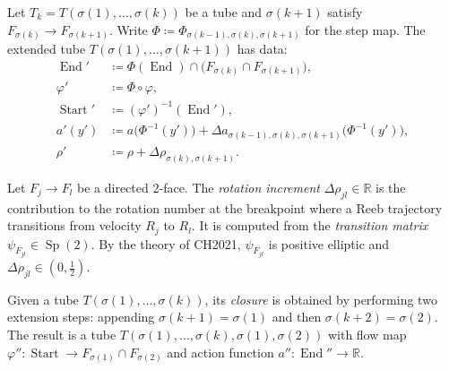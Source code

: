 \begin{unverified}
\begin{definition}\label{def:tube-extension}
Let $T_k = T(\sigma(1), \ldots, \sigma(k))$ be a tube
and $\sigma(k+1)$ satisfy $F_{\sigma(k)} \to F_{\sigma(k+1)}$.
Write $\Phi \coloneqq \Phi_{\sigma(k-1),\sigma(k),\sigma(k+1)}$
for the step map.
The extended tube $T(\sigma(1), \ldots, \sigma(k+1))$ has data:
\begin{align*}
  \operatorname{End}' &\coloneqq
    \Phi(\operatorname{End}) \cap \bigl( F_{\sigma(k)} \cap F_{\sigma(k+1)} \bigr), \\
  \varphi' &\coloneqq \Phi \circ \varphi, \\
  \operatorname{Start}' &\coloneqq (\varphi')^{-1}(\operatorname{End}'), \\
  a'(y') &\coloneqq
    a\bigl(\Phi^{-1}(y')\bigr)
    + \Delta a_{\sigma(k-1),\sigma(k),\sigma(k+1)}\bigl(\Phi^{-1}(y')\bigr), \\
  \rho' &\coloneqq \rho + \Delta\rho_{\sigma(k),\sigma(k+1)}.
\end{align*}
\end{definition}
\end{unverified}


\begin{unverified}
\begin{definition}\label{def:rotation-increment}
Let $F_j \to F_l$ be a directed $2$-face.
The \emph{rotation increment} $\Delta\rho_{jl} \in \mathbb{R}$
is the contribution to the rotation number at the breakpoint
where a Reeb trajectory transitions from velocity $R_j$ to $R_l$.
It is computed from the \emph{transition matrix}
$\psi_{F_{jl}} \in \operatorname{Sp}(2)$.
By the theory of CH2021, $\psi_{F_{jl}}$ is positive elliptic
and $\Delta\rho_{jl} \in (0, \tfrac{1}{2})$.
\end{definition}
\end{unverified}


\begin{unverified}
\begin{definition}\label{def:tube-close}
Given a tube $T(\sigma(1), \ldots, \sigma(k))$,
its \emph{closure} is obtained by performing two extension steps:
appending $\sigma(k+1) = \sigma(1)$ and then $\sigma(k+2) = \sigma(2)$.
The result is a tube $T(\sigma(1), \ldots, \sigma(k), \sigma(1), \sigma(2))$
with flow map $\varphi'' \colon \operatorname{Start} \to F_{\sigma(1)} \cap F_{\sigma(2)}$
and action function $a'' \colon \operatorname{End}'' \to \mathbb{R}$.
\end{definition}
\end{unverified}


